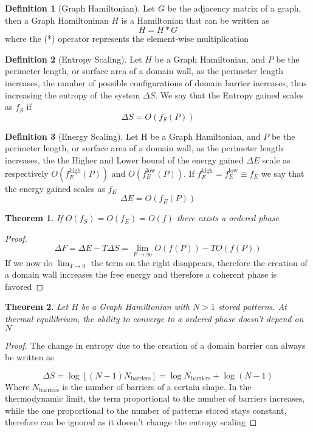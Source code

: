 \documentclass{article}
\newtheorem{theorem}{Theorem}[section]
\theoremstyle{definition}
\newtheorem{definition}{Definition}[section]
\theoremstyle{remark}
\begin{document}
\begin{definition}[Graph Hamiltonian]
    Let $G$ be the adjacency matrix of a graph, then a Graph Hamiltoninan $H$ is a Hamiltonian that can be written as
    \begin{equation}
        H=H*G
    \end{equation}
    where the (*) operator represents the element-wise multiplication
\end{definition}
\begin{definition}[Entropy Scaling]
    Let $H$ be a Graph Hamiltonian, and $P$ be the perimeter length, or surface area of a domain wall, as the perimeter length increases, the number of possible configurations of domain barrier increases, thus increasing the entropy of the system $\Delta S$.
    We say that the Entropy gained scales as $f_S$ if 
    \[
        \Delta S=O(f_S(P))
    \]
\end{definition}
\begin{definition}[Energy Scaling]
    Let H be a Graph Hamiltonian, and $P$ be the perimeter length, or surface area of a domain wall, as the perimeter length increases, the the Higher and Lower bound of the energy gained $\Delta E$ scale as respectively  $O(f_E^\textrm{high}(P))$ and $O(f_E^\textrm{low}(P))$. If $f_E^\textrm{high}=f_E^\textrm{low}\equiv f_E$ we say that the energy gained scales as $f_E$
    \[\Delta E=O(f_E(P))
    \]
\end{definition}
\begin{theorem}
\label{th:big-O}
    If $O(f_S)=O(f_E)=O(f)$ there exists a ordered phase
\end{theorem}
\begin{proof}
    \begin{equation}
        \Delta F= \Delta E -T\Delta S=\lim_{P\to \infty}O(f(P))-TO(f(P))
    \end{equation}
    If we now do $\lim_{T\to0}$ the term on the right disappears, therefore the creation of a domain wall increases the free energy and therefore a coherent phase is favored
\end{proof}
\begin{theorem}
        \label{th:no-care-N}
        Let $H$ be a Graph Hamiltonian with $N>1$ stored patterns. At thermal equilibrium, the ability to converge to a ordered phase doesn't depend on $N$
\end{theorem}
\begin{proof}
    The change in entropy due to the creation of a domain barrier can always be written as

    \begin{equation}
        \Delta S= \log\left[
            (N-1)N_\textrm{barriers}\right]=\log N_\textrm{barriers} + \log (N-1)
    \end{equation}
    Where $N_\textrm{barriers}$ is the number of barriers of a certain shape. In the thermodynamic limit, the term proportional to the number of barriers increases, while the one proportional to the number of patterns stored stays constant, therefore can be ignored as it doesn't change the entropy scaling
\end{proof}
\end{document}
